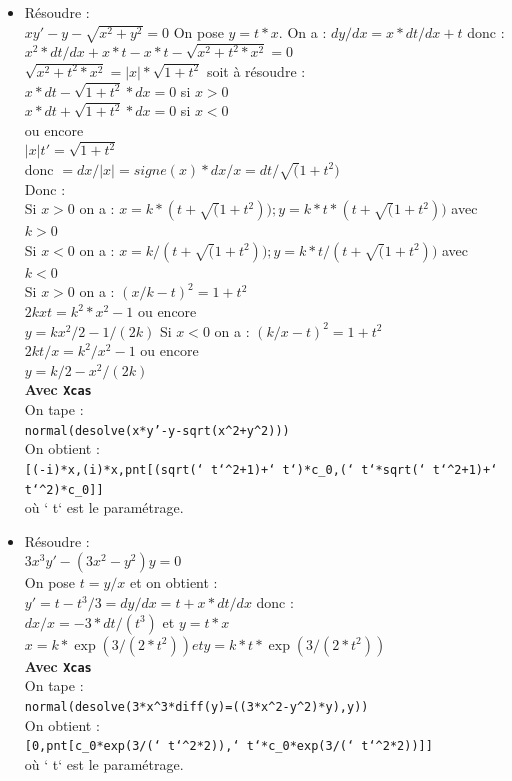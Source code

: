 \documentclass[a4paper,11pt]{book}
\begin{document}
\begin{itemize}
\item R\'esoudre :\\
$xy'-y-\sqrt{x^2+y^2}=0$
On pose $y=t*x$.
On a : $dy/dx=x*dt/dx+t$ donc :\\
$x^2*dt/dx+x*t-x*t-\sqrt{x^2+t^2*x^2}=0$ \\
$\sqrt{x^2+t^2*x^2}=|x|*\sqrt{1+t^2}$  soit \`a r\'esoudre :\\
$x*dt-\sqrt{1+t^2}*dx=0$ si $x>0$\\ 
$x*dt+\sqrt{1+t^2}*dx=0$ si $x<0$\\ 
ou encore \\
$|x|t'=\sqrt{1+t^2} $\\ 
donc $=dx/|x|=signe(x)*dx/x=dt/\sqrt(1+t^2)$\\
Donc :\\
Si $x>0$ on a : $x=k*(t+\sqrt(1+t^2)); y=k*t*(t+\sqrt(1+t^2))$ avec $k>0$\\
Si $x<0$ on a : $x=k/(t+\sqrt(1+t^2)); y=k*t/(t+\sqrt(1+t^2))$ avec $k<0$\\
Si $x>0$ on a : $(x/k-t)^2=1+t^2$\\
 $2kxt=k^2*x^2-1$ ou encore \\
$y=kx^2/2-1/(2k)$
Si $x<0$ on a : $(k/x-t)^2=1+t^2$\\
$2kt/x=k^2/x^2-1$ ou encore \\
$y=k/2-x^2/(2k)$\\
{\bf Avec {\tt Xcas}}\\
On tape :\\
{\tt normal(desolve(x*y'-y-sqrt(x\verb|^|2+y\verb|^|2)))}\\
On obtient :\\
{\tt [(-i)*x,(i)*x,pnt[(sqrt(` t`\verb|^|2+1)+` t`)*c\_0,(` t`*sqrt(` t`\verb|^|2+1)+` t`\verb|^|2)*c\_0]]}\\
o\`u ` t` est le param\'etrage. 
\item  R\'esoudre :\\
$3x^3y'-(3x^2-y^2)y=0$\\
On pose $t=y/x$ et on obtient :\\
$y'=t-t^3/3=dy/dx=t+x*dt/dx$ donc :\\
$dx/x=-3*dt/(t^3)$ et $y=t*x$
$x=k*\exp(3/(2*t^2)) et y=k*t*\exp(3/(2*t^2))$\\
{\bf Avec {\tt Xcas}}\\
On tape :\\
{\tt normal(desolve(3*x\verb|^|3*diff(y)=((3*x\verb|^|2-y\verb|^|2)*y),y))}\\
On obtient :\\
{\tt [0,pnt[c\_0*exp(3/(` t`\verb|^|2*2)),` t`*c\_0*exp(3/(` t`\verb|^|2*2))]]}\\
o\`u ` t` est le param\'etrage. 


\end{itemize}
\end{document}
